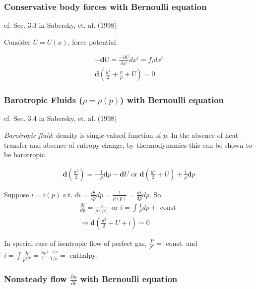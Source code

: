 \documentclass[10pt]{amsart}
\begin{document}
\begin{multicols*}{2}
\subsubsection{Conservative body forces with Bernoulli equation}

cf. Sec. 3.3 in Sabersky, et. al. (1998) \cite{SAHG1998}

Consider $U= U(x)$, force potential. 

\[
\begin{gathered}
	-\mathbf{d}U = \frac{ - \partial U}{\partial x^i} dx^i = f_i dx^i \\
 \mathbf{d}\left( \frac{u^2}{2} + \frac{p}{\rho} + U \right) = 0 
\end{gathered}
\]

\subsubsection{Barotropic Fluids ($\rho = \rho(p)$) with Bernoulli equation}

cf. Sec. 3.4 in Sabersky, et. al. (1998) \cite{SAHG1998}

\emph{Barotropic fluid}: density is single-valued function of $p$. In the absence of heat transfer and absence of entropy change, by thermodynamics this can be shown to be barotropic.

\[
\begin{gathered}
\mathbf{d} \left( \frac{u^2}{2} \right) = -\frac{1}{\rho} \mathbf{d}p - \mathbf{d}U \text{ or } \mathbf{d} \left( \frac{u^2}{2} + U \right) + \frac{1}{\rho} \mathbf{d}p
\end{gathered}
\]

Suppose $i=i(p)$ s.t. $di = \frac{\partial i}{\partial p} dp = \frac{1}{\rho (p)} = \frac{di}{dp} dp$. So
\[
\begin{gathered}
\frac{di}{dp} = \frac{1}{\rho(p)} \text{ or } i = \int \frac{1}{\rho} dp + \text{ const } \\
\Longrightarrow \mathbf{d} \left( \frac{u^2}{2} + U + i \right) = 0 
\end{gathered}
\]

In special case of isentropic flow of perfect gas, $\frac{P}{\rho^{\nu}} = $ const. and $ i =\int \frac{dp}{p^{1/\nu}} = \frac{kp^{1-1/\nu}}{1- 1/\nu} = $ enthalpy.

\subsubsection{Nonsteady flow $\frac{\partial u}{\partial t}$ with Bernoulli equation}


\end{multicols*}
\end{document}
